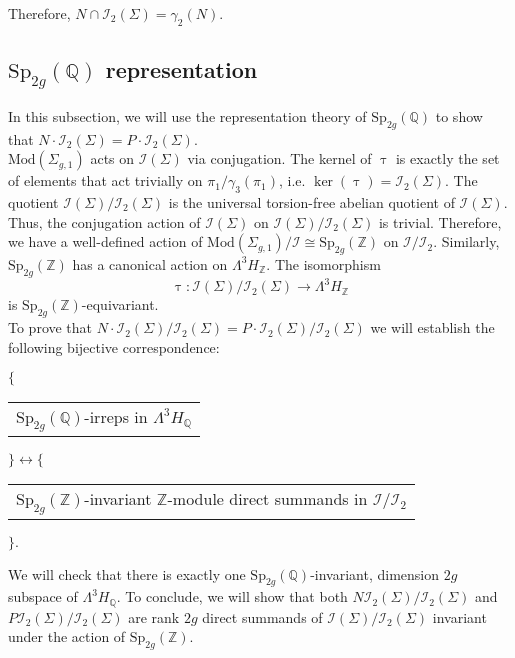 \documentclass[a4paper]{amsproc}
\theoremstyle{TheoremNum}
\theoremstyle{Theorembold}
\theoremstyle{TheoremboldDef}
\theoremstyle{TheoremboldRem}
\theoremstyle{TheoremboldRem}
\begin{document}
Therefore, $N\cap{{\mathcal{I}}_2(\Sigma)}=\gamma_2(N)$.

\subsection{${\text{Sp}_{2g}({\mathbb{Q}})}$ representation}\label{Niniap} In this subsection, we will use the representation theory of ${\text{Sp}_{2g}({\mathbb{Q}})}$ to show that $N\cdot{{\mathcal{I}}_2(\Sigma)}=P\cdot{{\mathcal{I}}_2(\Sigma)}$.\\

${\text{Mod}(\Sigma_{g,1})}$ acts on ${{\mathcal{I}}(\Sigma)}$ via conjugation. The kernel of $\uptau$ is exactly the set of elements that act trivially on $\pi_1/\gamma_3(\pi_1)$, i.e. $\ker(\uptau)={{\mathcal{I}}_2(\Sigma)}$. The quotient ${{\mathcal{I}}(\Sigma)}/{{\mathcal{I}}_2(\Sigma)}$ is the universal torsion-free abelian quotient of ${{\mathcal{I}}(\Sigma)}$. Thus, the conjugation action of ${{\mathcal{I}}(\Sigma)}$ on ${{\mathcal{I}}(\Sigma)}/{{\mathcal{I}}_2(\Sigma)}$ is trivial. Therefore, we have a well-defined action of ${\text{Mod}(\Sigma_{g,1})}/{\mathcal{I}}\cong{\text{Sp}_{2g}({\mathbb{Z}})}$ on ${\mathcal{I}}/{\mathcal{I}}_2$. Similarly, ${\text{Sp}_{2g}({\mathbb{Z}})}$ has a canonical action on $\Lambda^3 H_{\mathbb{Z}}$. The isomorphism \[\uptau:{{\mathcal{I}}(\Sigma)}/{{\mathcal{I}}_2(\Sigma)}\to \Lambda^3 H_{\mathbb{Z}}\] is ${\text{Sp}_{2g}({\mathbb{Z}})}$-equivariant. \\ To prove that $N\cdot {{\mathcal{I}}_2(\Sigma)}/{{\mathcal{I}}_2(\Sigma)}=P\cdot {{\mathcal{I}}_2(\Sigma)}/{{\mathcal{I}}_2(\Sigma)}$ we will establish the following bijective correspondence:\\ 
\begin{center}
 $\Big\{$ \begin{tabular}[t]{m{3.7cm}}
  ${\text{Sp}_{2g}({\mathbb{Q}})}$-irreps in $\Lambda^3H_{\mathbb{Q}}$ 
 \end{tabular}$\Big\}\longleftrightarrow\Big\{$ \begin{tabular}[t]{m{4.3cm}}
 ${\text{Sp}_{2g}({\mathbb{Z}})}$-invariant ${\mathbb{Z}}$-module direct summands in ${\mathcal{I}}/{\mathcal{I}}_2$
 \end{tabular}$\Big\}.$ \end{center}
 \vspace{.25cm}
  We will check that there is exactly one ${\text{Sp}_{2g}({\mathbb{Q}})}$-invariant, dimension $2g$ subspace of $\Lambda^3H_{\mathbb{Q}}$. To conclude, we will show that both $N{{\mathcal{I}}_2(\Sigma)}/{{\mathcal{I}}_2(\Sigma)}$ and $P{{\mathcal{I}}_2(\Sigma)}/{{\mathcal{I}}_2(\Sigma)}$ are rank $2g$ direct summands of ${{\mathcal{I}}(\Sigma)}/{{\mathcal{I}}_2(\Sigma)}$ invariant under the action of ${\text{Sp}_{2g}({\mathbb{Z}})}$.
\end{document}
